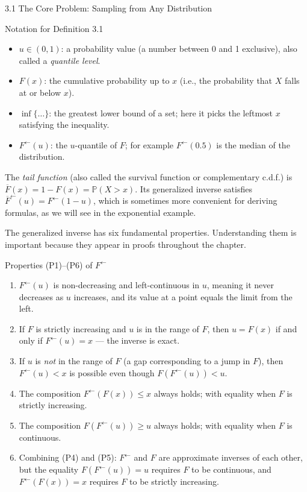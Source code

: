 \documentclass[aspectratio=169,10pt]{beamer}
\newcommand{\PP}{\mathbb{P}}
\newcommand{\FInv}{F^{\leftarrow}}
\begin{document}
\begin{frame}[allowframebreaks]{3.1 The Core Problem: Sampling from Any Distribution}
\begin{block}{Notation for Definition 3.1}
  \begin{itemize}
    \item $u \in (0,1)$: a probability value (a number between 0 and 1 exclusive),
      also called a \emph{quantile level}.
    \item $F(x)$: the cumulative probability up to $x$ (i.e., the probability
      that $X$ falls at or below $x$).
    \item $\inf\{\ldots\}$: the greatest lower bound of a set; here it picks
      the leftmost $x$ satisfying the inequality.
    \item $\FInv(u)$: the $u$-quantile of $F$; for example $\FInv(0.5)$ is the
      median of the distribution.
  \end{itemize}
\end{block}

The \emph{tail function} (also called the survival function or complementary c.d.f.)
is $\overline{F}(x) = 1 - F(x) = \PP(X > x)$.  Its generalized inverse satisfies
$\overline{F}^{\leftarrow}(u) = \FInv(1-u)$, which is sometimes more convenient
for deriving formulas, as we will see in the exponential example.

\framebreak

The generalized inverse has six fundamental properties.  Understanding them is
important because they appear in proofs throughout the chapter.

\begin{block}{Properties (P1)--(P6) of $\FInv$}
  \begin{enumerate}[(P1)]
    \item $\FInv(u)$ is non-decreasing and left-continuous in $u$, meaning
          it never decreases as $u$ increases, and its value at a point equals
          the limit from the left.
    \item If $F$ is strictly increasing and $u$ is in the range of $F$, then
          $u = F(x)$ if and only if $\FInv(u) = x$ --- the inverse is exact.
    \item If $u$ is \emph{not} in the range of $F$ (a gap corresponding to
          a jump in $F$), then $\FInv(u) < x$ is possible even though $F(\FInv(u)) < u$.
    \item The composition $\FInv(F(x)) \le x$ always holds; with equality
          when $F$ is strictly increasing.
    \item The composition $F(\FInv(u)) \ge u$ always holds; with equality
          when $F$ is continuous.
    \item Combining (P4) and (P5): $\FInv$ and $F$ are approximate inverses of
          each other, but the equality $F(\FInv(u)) = u$ requires $F$ to be
          continuous, and $\FInv(F(x)) = x$ requires $F$ to be strictly increasing.
  \end{enumerate}
\end{block}


\end{frame}
\end{document}
